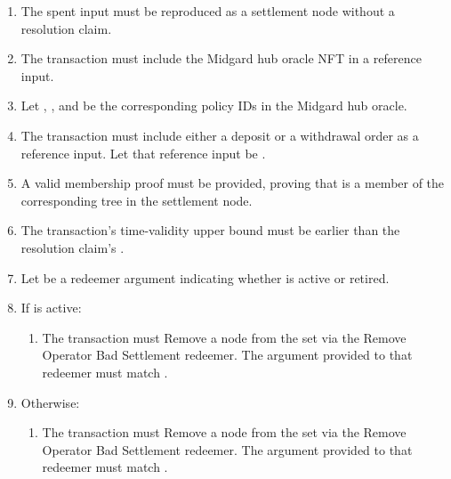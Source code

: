\documentclass[../midgard.tex]{subfiles}
\begin{document}
\begin{description}
\begin{enumerate}
        \item The spent input must be reproduced as a settlement node without a resolution claim.
        \item The transaction must include the Midgard hub oracle NFT in a reference input.
        \item Let , , and  be the corresponding policy IDs in the Midgard hub oracle.
        \item The transaction must include either a deposit or a withdrawal order as a reference input.
          Let that reference input be .
        \item A valid membership proof must be provided, proving that  is a member of the corresponding tree in the settlement node.
        \item The transaction's time-validity upper bound must be earlier than the resolution claim's .
        \item Let  be a redeemer argument indicating whether  is active or retired.
        \item If  is active:
            \begin{enumerate}
                \item The transaction must Remove a node from the  set via the Remove Operator Bad Settlement redeemer.
                  The  argument provided to that redeemer must match .
            \end{enumerate}
        \item Otherwise:
            \begin{enumerate}
                \item The transaction must Remove a node from the  set via the Remove Operator Bad Settlement redeemer.
                  The  argument provided to that redeemer must match .
            \end{enumerate}
      \end{enumerate}
\end{description}
\end{document}
